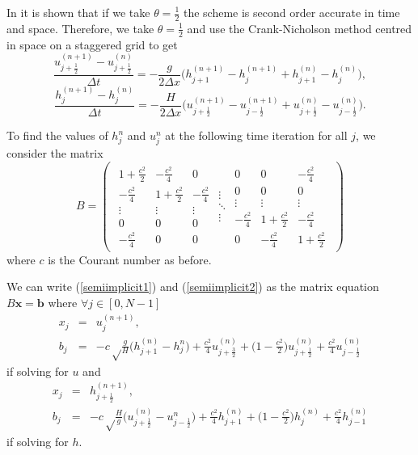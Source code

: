 \documentclass[a4paper, 10pt, notitlepage]{article}
\begin{document}
In \cite{implicit} it is shown that if we take $\theta = \frac{1}{2}$ the scheme is second order accurate in time and space. Therefore, we take $\theta = \frac{1}{2}$ and use the Crank-Nicholson method centred in space on a staggered grid to get
\begin{equation}\label{semiimplicit1}
\frac{u_{j + \frac{1}{2}}^{(n + 1)} - u_{j + \frac{1}{2}}^{(n)}}{\Delta t} = -\frac{g}{2\Delta x} \bigg(h_{j + 1}^{(n+ 1)} - h_{j}^{(n+ 1)} + h_{j + 1}^{(n)} - h_{j}^{(n)}\bigg),
\end{equation}
\begin{equation}\label{semiimplicit2}
\frac{h_{j}^{(n + 1)} - h_{j}^{(n)}}{\Delta t} = -\frac{H}{2\Delta x} \bigg(u_{j + \frac{1}{2}}^{(n+ 1)} - u_{j - \frac{1}{2}}^{(n+ 1)} + u_{j + \frac{1}{2}}^{(n)} - u_{j - \frac{1}{2}}^{(n)}\bigg).
\end{equation}

To find the values of $h_{j}^{n}$ and $u_{j}^{n}$ at the following time iteration for all $j$, we consider the matrix
\[
B = \left (
\begin{array}{ccc}
\begin{array}{ccc}
1 + \frac{c^{2}}{2} & -\frac{c^{2}}{4} & 0\\
-\frac{c^{2}}{4}& 1 + \frac{c^{2}}{2} & -\frac{c^{2}}{4} \\
\vdots & \vdots & \vdots\\
0 & 0  & 0 \\
- \frac{c^{2}}{4}  & 0  & 0 
\end{array}
\begin{array}{c}
\vdots\\ 
\ddots\\
\vdots
\end{array}
\begin{array}{ccc}
0  & 0  &  - \frac{c^{2}}{4}\\
0  & 0& 0\\
\vdots & \vdots & \vdots\\
-\frac{c^{2}}{4}& 1 + \frac{c^{2}}{2} & -\frac{c^{2}}{4} \\
0 & -\frac{c^{2}}{4} & 1 + \frac{c^{2}}{2}
\end{array}
\end{array}
\right )
\]
where $c$ is the Courant number as before.

We can write (\ref{semiimplicit1}) and (\ref{semiimplicit2}) as the matrix equation $B \mathbf{x} = \mathbf{b}$ where $ \forall j \in [0, N-1]$
\begin{eqnarray}
x_{j} &= & u_{j}^{(n+1)},\\
b_{j} &= & -c\sqrt\frac{g}{H}\bigg(h_{j + 1}^{(n)} - h_{j}^{n}\bigg) + \frac{c^{2}}{4} u_{j + \frac{3}{2}}^{(n)} + \bigg(1 - \frac{c^{2}}{2}\bigg)u_{j + \frac{1}{2}}^{(n)} + \frac{c^{2}}{4} u_{j - \frac{1}{2}}^{(n)}
\end{eqnarray}
if solving for $u$ and
\begin{eqnarray}
x_{j} & =& h_{j+ \frac{1}{2}}^{(n+1)},\\
b_{j} &= &-c\sqrt\frac{H}{g}\bigg(u_{j + \frac{1}{2}}^{(n)} - u_{j - \frac{1}{2}}^{n}\bigg) + \frac{c^{2}}{4} h_{j + 1}^{(n)} + \bigg(1 - \frac{c^{2}}{2}\bigg)h_{j}^{(n)} + \frac{c^{2}}{4} h_{j - 1}^{(n)}
\end{eqnarray}
if solving for $h$.
\end{document}
